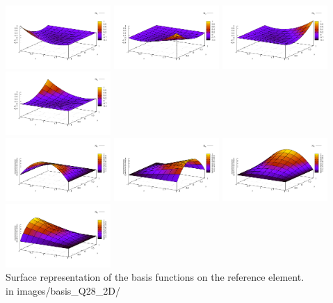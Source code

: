 \begin{center}
\includegraphics[width=4cm]{images/basis_Q28_2D/N1}
\includegraphics[width=4cm]{images/basis_Q28_2D/N2}
\includegraphics[width=4cm]{images/basis_Q28_2D/N3}
\includegraphics[width=4cm]{images/basis_Q28_2D/N4}\\
\includegraphics[width=4cm]{images/basis_Q28_2D/N5}
\includegraphics[width=4cm]{images/basis_Q28_2D/N6}
\includegraphics[width=4cm]{images/basis_Q28_2D/N7}
\includegraphics[width=4cm]{images/basis_Q28_2D/N8}\\
{\captionfont Surface representation of the basis functions on the reference element.\\
{\color{gray} in images/basis\_Q28\_2D/ }}
\end{center}



